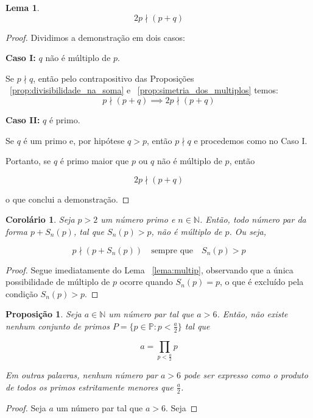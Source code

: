 \documentclass[a4paper,11pt]{article}
\newtheorem{lemma}[theorem]{Lema}
\newtheorem{proposition}[theorem]{Proposição}
\newtheorem{corollary}[theorem]{Corolário}
\theoremstyle{definition}
\theoremstyle{remark}
\begin{document}
\begin{otherlanguage}{brazil}
\begin{lemma}
		\[
		2p \nmid (p + q)
		\]
	\end{lemma}
	\begin{proof}
		Dividimos a demonstração em dois casos:
		
		\textbf{Caso I:} \(q\) não é múltiplo de \(p\).
		
		Se \(p \nmid q \), então pelo contrapositivo das  Proposições ~\ref{prop:divisibilidade_na_soma} e ~\ref{prop:simetria_dos_multiplos} temos:
		\[
		 p \nmid (p + q) \implies 2p \nmid (p + q)
		\] 
		
		\textbf{Caso II:} \(q\) é primo.
		
		Se \(q\) é um primo e, por hipótese \(q > p\), então \(p \nmid q \) e procedemos como no Caso I.
		
		Portanto, se \(q\) é primo maior que \(p\) ou \(q\) não é múltiplo de \(p\), então 
		
		\[
		2p \nmid (p + q)
		\]
		
		o que conclui a demonstração.
		
	\end{proof}
	
	\begin{corollary}
		Seja \(p > 2\) um número primo e \(n \in \mathbb{N}\). Então, todo número par da forma \(p + S_n(p)\), tal que \(S_n(p) > p\), não é múltiplo de \(p\). Ou seja,
		
		\[
		p \nmid (p + S_n(p)) \quad \text{sempre que} \quad S_n(p) > p
		\]
		
	\end{corollary}
	
	\begin{proof}
		Segue imediatamente do Lema ~\ref{lema:multip}, observando que a única possibilidade de múltiplo de \(p\) ocorre quando \(S_n(p) = p\), o que é excluído pela condição \(S_n(p) > p\).
	\end{proof}
	
	
	\begin{proposition}\label{prop: produto_p_menores_a_meio}
		Seja \(a \in \mathbb{N}\) um número par tal que \(a > 6\). Então, não existe nenhum conjunto de primos \(P = \{p \in \mathbb{P} : p < \frac{a}{2}\}\) tal que
		
		\[
		a = \prod_{p < \frac{a}{2}} p
		\]
		
		Em outras palavras, nenhum número par \(a > 6\) pode ser expresso como o produto de todos os primos estritamente menores que \(\frac{a}{2}\).
	\end{proposition}
	
	\begin{proof}
		Seja \(a\) um número par tal que \(a > 6\). Seja
		

\end{proof}
\end{otherlanguage}
\end{document}
